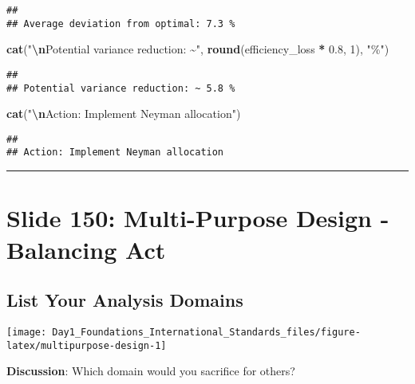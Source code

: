 \documentclass[
]{article}
\newenvironment{Shaded}{\begin{snugshade}}{\end{snugshade}}
\newcommand{\DecValTok}[1]{\textcolor[rgb]{0.00,0.00,0.81}{#1}}
\newcommand{\FloatTok}[1]{\textcolor[rgb]{0.00,0.00,0.81}{#1}}
\newcommand{\FunctionTok}[1]{\textcolor[rgb]{0.13,0.29,0.53}{\textbf{#1}}}
\newcommand{\NormalTok}[1]{#1}
\newcommand{\SpecialCharTok}[1]{\textcolor[rgb]{0.81,0.36,0.00}{\textbf{#1}}}
\newcommand{\StringTok}[1]{\textcolor[rgb]{0.31,0.60,0.02}{#1}}
\begin{document}
\begin{verbatim}
## 
## Average deviation from optimal: 7.3 %
\end{verbatim}

\begin{Shaded}
\begin{Highlighting}[]
\FunctionTok{cat}\NormalTok{(}\StringTok{"}\SpecialCharTok{\textbackslash{}n}\StringTok{Potential variance reduction: \textasciitilde{}"}\NormalTok{, }
    \FunctionTok{round}\NormalTok{(efficiency\_loss }\SpecialCharTok{*} \FloatTok{0.8}\NormalTok{, }\DecValTok{1}\NormalTok{), }\StringTok{"\%"}\NormalTok{)}
\end{Highlighting}
\end{Shaded}

\begin{verbatim}
## 
## Potential variance reduction: ~ 5.8 %
\end{verbatim}

\begin{Shaded}
\begin{Highlighting}[]
\FunctionTok{cat}\NormalTok{(}\StringTok{"}\SpecialCharTok{\textbackslash{}n}\StringTok{Action: Implement Neyman allocation"}\NormalTok{)}
\end{Highlighting}
\end{Shaded}

\begin{verbatim}
## 
## Action: Implement Neyman allocation
\end{verbatim}

\begin{center}\rule{0.5\linewidth}{0.5pt}\end{center}

\section{Slide 150: Multi-Purpose Design - Balancing
Act}\label{slide-150-multi-purpose-design---balancing-act}

\subsection{List Your Analysis
Domains}\label{list-your-analysis-domains}

\texttt{[image: Day1\_Foundations\_International\_Standards\_files/figure-latex/multipurpose-design-1]}

\textbf{Discussion}: Which domain would you sacrifice for others?
\end{document}
